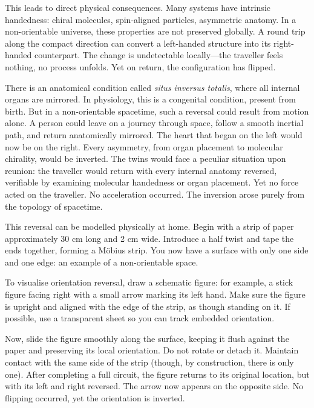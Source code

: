 This leads to direct physical consequences. Many systems have intrinsic handedness: chiral molecules, spin-aligned particles, asymmetric anatomy. In a non-orientable universe, these properties are not preserved globally. A round trip along the compact direction can convert a left-handed structure into its right-handed counterpart. The change is undetectable locally—the traveller feels nothing, no process unfolds. Yet on return, the configuration has flipped.

There is an anatomical condition called \textit{situs inversus totalis}, where all internal organs are mirrored. In physiology, this is a congenital condition, present from birth. But in a non-orientable spacetime, such a reversal could result from motion alone. A person could leave on a journey through space, follow a smooth inertial path, and return anatomically mirrored. The heart that began on the left would now be on the right. Every asymmetry, from organ placement to molecular chirality, would be inverted. The twins would face a peculiar situation upon reunion: the traveller would return with every internal anatomy reversed, verifiable by examining molecular handedness or organ placement. Yet no force acted on the traveller. No acceleration occurred. The inversion arose purely from the topology of spacetime.

\begin{commentary}
This reversal can be modelled physically at home. Begin with a strip of paper approximately 30 cm long and 2 cm wide. Introduce a half twist and tape the ends together, forming a Möbius strip. You now have a surface with only one side and one edge: an example of a non-orientable space.

To visualise orientation reversal, draw a schematic figure: for example, a stick figure facing right with a small arrow marking its left hand. Make sure the figure is upright and aligned with the edge of the strip, as though standing on it. If possible, use a transparent sheet so you can track embedded orientation.

Now, slide the figure smoothly along the surface, keeping it flush against the paper and preserving its local orientation. Do not rotate or detach it. Maintain contact with the same \QSOpen{}side\QSClose{} of the strip (though, by construction, there is only one). After completing a full circuit, the figure returns to its original location, but with its left and right reversed. The arrow now appears on the opposite side. No flipping occurred, yet the orientation is inverted.
\end{commentary}